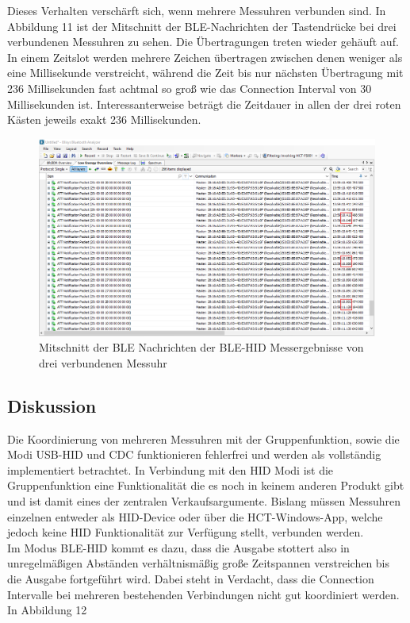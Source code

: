 Dieses Verhalten verschärft sich, wenn mehrere Messuhren verbunden sind. In Abbildung 11 ist der Mitschnitt der BLE-Nachrichten der Tastendrücke bei drei verbundenen Messuhren zu sehen. Die Übertragungen treten wieder gehäuft auf. In einem Zeitslot werden mehrere Zeichen übertragen zwischen denen weniger als eine Millisekunde verstreicht, während die Zeit bis nur nächsten Übertragung mit 236 Millisekunden fast achtmal so groß wie das Connection Interval von 30 Millisekunden ist. Interessanterweise beträgt die Zeitdauer in allen der drei roten Kästen jeweils exakt 236 Millisekunden.
\begin{figure}[H] 
	\centering
	\includegraphics[width=\textwidth]{figures/BLEHID2device.png}
	\caption{Mitschnitt der BLE Nachrichten der BLE-HID Messergebnisse von drei verbundenen Messuhr}
\end{figure}

\subsection{Diskussion}
Die Koordinierung von mehreren Messuhren mit der Gruppenfunktion, sowie die Modi \ac{USB}-\ac{HID} und \ac{CDC} funktionieren fehlerfrei und werden als vollständig implementiert betrachtet. In Verbindung mit den HID Modi ist die Gruppenfunktion eine Funktionalität die es noch in keinem anderen Produkt gibt und ist damit eines der zentralen Verkaufsargumente. Bislang müssen Messuhren einzelnen entweder als HID-Device oder über die HCT-Windows-App, welche jedoch keine HID Funktionalität zur Verfügung stellt, verbunden werden.\\
Im Modus \ac{BLE}-\ac{HID} kommt es dazu, dass die Ausgabe stottert also in unregelmäßigen Abständen verhältnismäßig große Zeitspannen verstreichen bis die Ausgabe fortgeführt wird. Dabei steht in Verdacht, dass die Connection Intervalle bei mehreren bestehenden Verbindungen nicht gut koordiniert werden. In Abbildung 12

